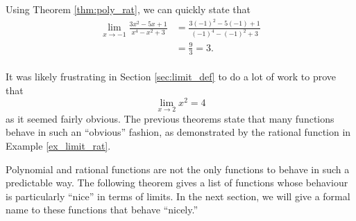 \enlargethispage{1\baselineskip}

{Using Theorem \ref{thm:poly_rat}, we can quickly state that 
	\begin{align*} \lim_{x\to -1}\frac{3x^2-5x+1}{x^4-x^2+3} &= \frac{3(-1)^2-5(-1)+1}{(-1)^4-(-1)^2+3} \\
												&= \frac{9}{3} =3.
	\end{align*}
\baselineskip
}\\

It was likely frustrating in Section \ref{sec:limit_def} to do a lot of work to prove that 
\[
\lim_{x\to 2} x^2 = 4
\]
as it seemed fairly obvious. The previous theorems state that many functions behave in such an ``obvious'' fashion, as demonstrated by the rational function in Example \ref{ex_limit_rat}. 

Polynomial and rational functions are not the only functions to behave in such a predictable way. The following theorem gives a list of functions whose behaviour is particularly ``nice'' in terms of limits. In the next section, we will give a formal name to these functions that behave ``nicely.''

